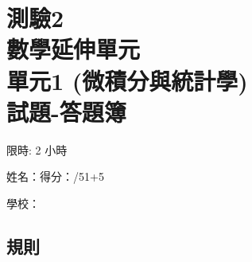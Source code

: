 \documentclass[12pt]{article}
\begin{document}
    \thispagestyle{empty}

    \centering 

    \section*{測驗2\\數學延伸單元\\單元1 (微積分與統計學)\\試題-答題簿}

    限時: 2 小時

    姓名：\hrulefill \hfill 得分：\hrulefill/51+5

    學校：\hrulefill

    \raggedright

    \subsection*{規則}
\end{document}
